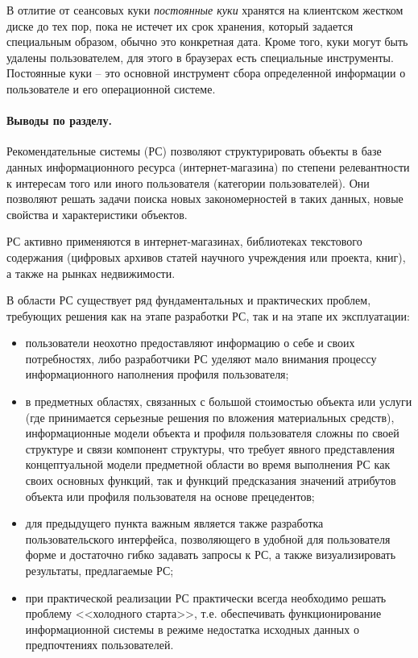 \documentclass[a4paper,14pt,openany,final]{extreport} %
\begin{document}
В отлитие от сеансовых куки \emph{постоянные куки} хранятся на клиентском жестком диске до тех пор, пока не истечет их срок хранения, который задается специальным образом, обычно это конкретная дата. Кроме того, куки могут быть удалены пользователем, для этого в браузерах есть специальные инструменты. Постоянные куки -- это основной инструмент сбора определенной информации о пользователе и его операционной системе.

\paragraph{Выводы по разделу.}

Рекомендательные системы (РС) позволяют структурировать объекты в базе данных информационного ресурса (интернет-магазина) по степени релевантности к интересам того или иного пользователя (категории пользователей). Они позволяют решать задачи поиска новых закономерностей в таких данных, новые свойства и характеристики объектов.

РС активно применяются в интернет-магазинах, библиотеках текстового содержания (цифровых архивов статей научного учреждения или проекта, книг), а также на рынках недвижимости.

В области РС существует ряд фундаментальных и практических проблем, требующих решения как на этапе разработки РС, так и на этапе их эксплуатации:
\begin{itemize}
\item пользователи неохотно предоставляют информацию о себе и
  своих потребностях, либо разработчики РС уделяют мало внимания
  процессу информационного наполнения профиля пользователя;
\item в предметных областях, связанных с большой стоимостью объекта или услуги (где принимается серьезные решения по вложения материальных средств), информационные модели объекта и профиля пользователя сложны по своей структуре и связи компонент структуры, что требует явного представления концептуальной модели предметной области во время выполнения РС как своих основных функций, так и функций предсказания значений атрибутов объекта или профиля пользователя на основе прецедентов;
\item для предыдущего пункта важным является также разработка пользовательского интерфейса, позволяющего в удобной для пользователя форме и достаточно гибко задавать запросы к РС, а также визуализировать результаты, предлагаемые РС;
\item при практической реализации РС практически всегда необходимо решать проблему <<холодного старта>>, т.е. обеспечивать функционирование информационной системы в режиме недостатка исходных данных о предпочтениях пользователей.
\end{itemize}
\end{document}
